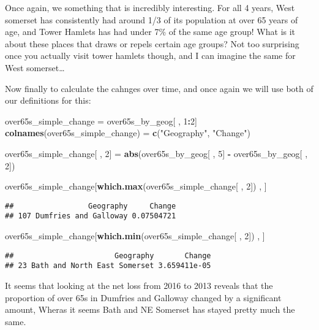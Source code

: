 \documentclass[]{article}
\newenvironment{Shaded}{\begin{snugshade}}{\end{snugshade}}
\newcommand{\KeywordTok}[1]{\textcolor[rgb]{0.13,0.29,0.53}{\textbf{#1}}}
\newcommand{\DecValTok}[1]{\textcolor[rgb]{0.00,0.00,0.81}{#1}}
\newcommand{\StringTok}[1]{\textcolor[rgb]{0.31,0.60,0.02}{#1}}
\newcommand{\OperatorTok}[1]{\textcolor[rgb]{0.81,0.36,0.00}{\textbf{#1}}}
\newcommand{\NormalTok}[1]{#1}
\begin{document}
Once again, we something that is incredibly interesting. For all 4
years, West somerset has consistently had around 1/3 of its population
at over 65 years of age, and Tower Hamlets has had under 7\% of the same
age group! What is it about these places that draws or repels certain
age groups? Not too surprising once you actually visit tower hamlets
though, and I can imagine the same for West somerset\ldots{}

Now finally to calculate the cahnges over time, and once again we will
use both of our definitions for this:

\begin{Shaded}
\begin{Highlighting}[]
\NormalTok{over65s_simple_change =}\StringTok{ }\NormalTok{over65s_by_geog[ , }\DecValTok{1}\OperatorTok{:}\DecValTok{2}\NormalTok{]}
\KeywordTok{colnames}\NormalTok{(over65s_simple_change) =}\StringTok{ }\KeywordTok{c}\NormalTok{(}\StringTok{"Geography"}\NormalTok{, }\StringTok{"Change"}\NormalTok{)}

\NormalTok{over65s_simple_change[ , }\DecValTok{2}\NormalTok{] =}\StringTok{ }\KeywordTok{abs}\NormalTok{(over65s_by_geog[ , }\DecValTok{5}\NormalTok{] }\OperatorTok{-}\StringTok{ }\NormalTok{over65s_by_geog[ , }\DecValTok{2}\NormalTok{])}

\NormalTok{over65s_simple_change[}\KeywordTok{which.max}\NormalTok{(over65s_simple_change[ , }\DecValTok{2}\NormalTok{]) , ]}
\end{Highlighting}
\end{Shaded}

\begin{verbatim}
##                 Geography     Change
## 107 Dumfries and Galloway 0.07504721
\end{verbatim}

\begin{Shaded}
\begin{Highlighting}[]
\NormalTok{over65s_simple_change[}\KeywordTok{which.min}\NormalTok{(over65s_simple_change[ , }\DecValTok{2}\NormalTok{]) , ]}
\end{Highlighting}
\end{Shaded}

\begin{verbatim}
##                       Geography       Change
## 23 Bath and North East Somerset 3.659411e-05
\end{verbatim}

It seems that looking at the net loss from 2016 to 2013 reveals that the
proportion of over 65s in Dumfries and Galloway changed by a significant
amount, Wheras it seems Bath and NE Somerset has stayed pretty much the
same.
\end{document}
